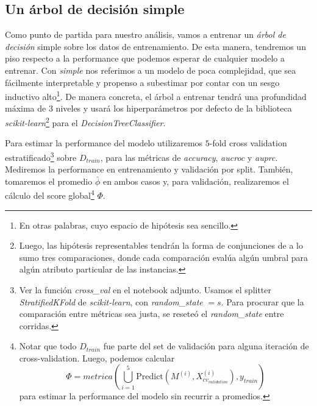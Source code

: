 \subsection{Un árbol de decisión simple}\label{simple}

Como punto de partida para nuestro análisis, vamos a entrenar un \textit{árbol de decisión} simple sobre los datos de entrenamiento. De esta manera, tendremos un piso respecto a la performance que podemos esperar de cualquier modelo a entrenar. Con \textit{simple} nos referimos a un modelo de poca complejidad, que sea fácilmente interpretable y propenso a subestimar por contar con un sesgo inductivo alto\footnote{En otras palabras, cuyo espacio de hipótesis sea sencillo.}. De manera concreta, el árbol a entrenar tendrá una profundidad máxima de $3$ niveles y usará los hiperparámetros por defecto de la biblioteca \textit{scikit-learn}\footnote{Luego, las hipótesis representables tendrán la forma de conjunciones de a lo sumo tres comparaciones, donde cada comparación evalúa algún umbral para algún atributo particular de las instancias.} para el \textit{DecisionTreeClassifier}.

Para estimar la performance del modelo utilizaremos $5$-fold cross validation estratificado\footnote{Ver la función \textit{cross\_val} en el notebook adjunto. Usamos el splitter \textit{StratifiedKFold} de \textit{scikit-learn}, con \textit{random\_state} $= s$. Para procurar que la comparación entre métricas sea justa, se reseteó el \textit{random\_state} entre corridas.} sobre $D_{train}$, para las métricas de \textit{accuracy}, \textit{aucroc} y \textit{auprc}. Mediremos la performance en entrenamiento y validación por split. También, tomaremos el promedio $\bar\phi$ en ambos casos y, para validación, realizaremos el cálculo del score global\footnote{Notar que todo $D_{train}$ fue parte del set de validación para alguna iteración de cross-validation. Luego, podemos calcular $$\Phi = metrica(\bigcup_{i=1}^5\text{Predict}(M^{(i)}, X_{cv_{validation}}^{(i)}), y_{train})$$ para estimar la performance del modelo sin recurrir a promedios.} $\Phi$.

